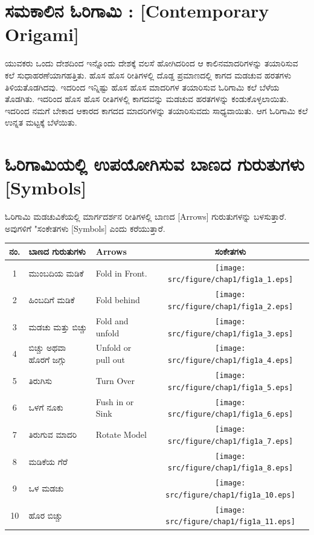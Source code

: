 
\section*{ಸಮಕಾಲಿನ ಓರಿಗಾಮಿ : [Contemporary Origami]}
ಯುವಕರು ಒಂದು ದೇಶದಿಂದ ಇನ್ನೊಂದು ದೇಶಕ್ಕೆ ವಲಸೆ ಹೋಗಿದರಿಂದ ಆ ಕಾಲಿನ\break ಮಾದರಿಗಳನ್ನು ತಯಾರಿಸುವ ಕಲೆ ಸುಧಾಹರಣೆಯಾಗಹತ್ತಿತು. ಹೊಸ ಹೊಸ ರೀತಿಗ\break ಳಲ್ಲಿ ದೊಡ್ಡ ಪ್ರಮಾಣದಲ್ಲಿ ಕಾಗದ ಮಡಚುವ ಹರತಗಳು ತಿಳಿಯತೊಡಗಿದವು. ಇದರಿಂದ ಇನ್ನಿಷ್ಟು ಹೊಸ ಹೊಸ  ಮಾದರಿಗಳ ತಯಾರಿಸುವ ಓರಿಗಾಮಿ ಕಲೆ ಬೆಳೆಯ ತೊಡಗಿತು. ಇದರಿಂದ ಹೊಸ ಹೊಸ ರೀತಿಗಳಲ್ಲಿ ಕಾಗದವನ್ನು ಮಡಚುವ ಹರತಗಳನ್ನು ಕಂಡುಕೊಳ್ಳಲಾ\break ಯಿತು. ಇದರಿಂದ ನಮಗೆ ಬೇಕಾದ ಆಕಾರದ ಕಾಗದದ ಮಾದರಿಗಳನ್ನು ತಯಾರಿಸುವದು ಸಾಧ್ಯವಾಯಿತು. ಆಗ ಓರಿಗಾಮಿ ಕಲೆ ಉನ್ನತ ಮಟ್ಟಕ್ಕೆ ಬೆಳೆಯಿತು. 


\section{ಓರಿಗಾಮಿಯಲ್ಲಿ ಉಪಯೋಗಿಸುವ ಬಾಣದ ಗುರುತುಗಳು [Symbols]}\label{sec1.3}%
ಓರಿಗಾಮಿ ಮಡಚುವಿಕೆಯಲ್ಲಿ ಮಾರ್ಗದರ್ಶನ ರೀತಿಗಳಲ್ಲಿ ಬಾಣದ [Arrows] ಗುರುತು\break ಗಳನ್ನು ಬಳಸುತ್ತಾರೆ. ಅವುಗಳಿಗೆ "ಸಂಕೇತಗಳು [Symbols] ಎಂದು ಕರೆಯುತ್ತಾರೆ. 

\medskip

\begin{longtable}[l]{|c|l|l|c|}
\hline
ನಂ.  & ಬಾಣದ ಗುರುತುಗಳು & Arrows & ಸಂಕೇತಗಳು \\[0.1cm]
\hline
1  & ಮುಂಬದಿಯ ಮಡಿಕೆ & Fold in Front. & {\texttt{[image: src/figure/chap1/fig1a\_1.eps]}}\\[0.1cm]
\hline
2 &ಹಿಂಬದಿಗೆ ಮಡಿಕೆ &  Fold behind & {\texttt{[image: src/figure/chap1/fig1a\_2.eps]}}\\[0.1cm]
\hline
3 & ಮಡಚು ಮತ್ತು ಬಿಚ್ಚು & Fold and unfold & {\texttt{[image: src/figure/chap1/fig1a\_3.eps]}}\\[0.1cm]
\hline
4 & ಬಿಚ್ಚು  ಅಥವಾ ಹೊರಗೆ ಜಗ್ಗು & Unfold or pull out & {\texttt{[image: src/figure/chap1/fig1a\_4.eps]}}\\[0.1cm]
\hline
5 & ತಿರುಗಿಸು & Turn Over & {\texttt{[image: src/figure/chap1/fig1a\_5.eps]}}\\[0.1cm]
\hline
6 & ಒಳಗೆ ನೂಕು & Fush in or Sink & {\texttt{[image: src/figure/chap1/fig1a\_6.eps]}}\\[0.1cm]
\hline
7 & ತಿರುಗುವ ಮಾದರಿ &  Rotate Model & {\texttt{[image: src/figure/chap1/fig1a\_7.eps]}}\\[0.1cm]
\hline
8 & ಮಡಿಕೆಯ ಗೆರೆ & & {\texttt{[image: src/figure/chap1/fig1a\_8.eps]}}\\[0.1cm]
\hline
9 & ಒಳ ಮಡಚು & & {\texttt{[image: src/figure/chap1/fig1a\_10.eps]}}\\[0.1cm]
\hline
10 & ಹೊರ ಬಿಚ್ಚು & & {\texttt{[image: src/figure/chap1/fig1a\_11.eps]}}\\[0.1cm]
\hline
\end{longtable}

